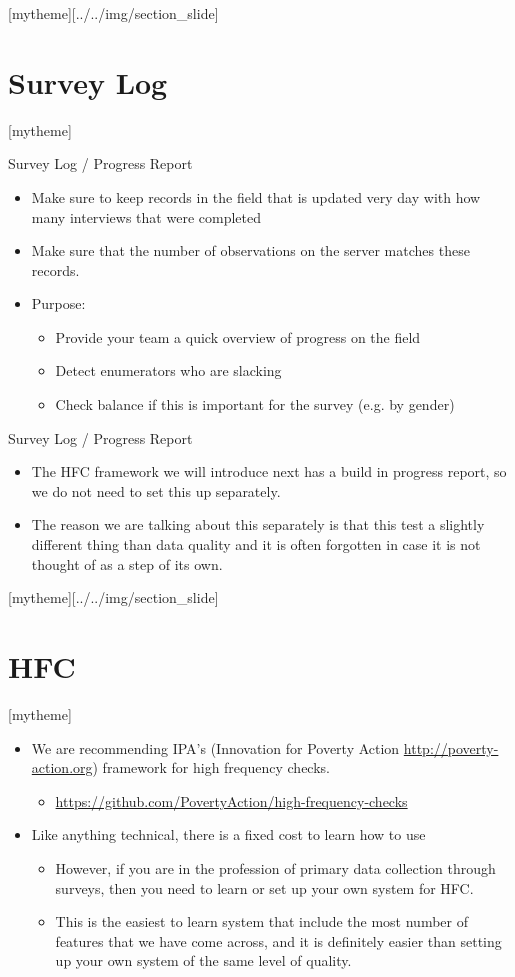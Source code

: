 \documentclass[aspectratio=169]{beamer}
\newcommand{\sectionpic}[2]{
	\setbeamertemplate{section page}[mytheme][#2]
	\section{#1}
	\setbeamertemplate{section page}[mytheme]
}
\begin{document}
\sectionpic{Survey Log}{../../img/section_slide}



\begin{frame}{Survey Log / Progress Report}
	\begin{itemize}
		\item Make sure to keep records in the field that is updated very day with how many interviews that were completed
		\item Make sure that the number of observations on the server matches these records.
		\item Purpose:
		\begin{itemize}
			\item Provide your team a quick overview of progress on the field
			\item Detect enumerators who are slacking
			\item Check balance if this is important for the survey (e.g. by gender)
		\end{itemize}
	\end{itemize}
\end{frame}


\begin{frame}{Survey Log / Progress Report}
	\begin{itemize}
		\item The HFC framework we will introduce next has a build in progress report, so we do not need to set this up separately. 
		\item The reason we are talking about this separately is that this test a slightly different thing than data quality and it is often forgotten in case it is not thought of as a step of its own.
	\end{itemize}
\end{frame}

\sectionpic{HFC}{../../img/section_slide}

\begin{frame}
	\begin{itemize}
		\item We are recommending IPA's (Innovation for Poverty Action \url{http://poverty-action.org}) framework for high frequency checks. 
		\begin{itemize}
			\item \url{https://github.com/PovertyAction/high-frequency-checks}
		\end{itemize}
		\item Like anything technical, there is a fixed cost to learn how to use
		\begin{itemize}
			\item However, if you are in the profession of primary data collection through surveys, then you need to learn or set up your own system for HFC. 
			\item This is the easiest to learn system that include the most number of features that we have come across, and it is definitely easier than setting up your own system of the same level of quality.
		\end{itemize}
	\end{itemize}
\end{frame}
\end{document}
